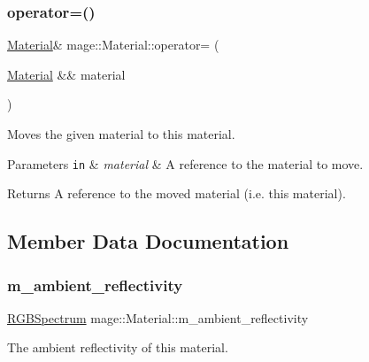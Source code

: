 \subsubsection{\texorpdfstring{operator=()}{operator=()}\hspace{0.1cm}{\footnotesize\ttfamily [2/2]}}
{\footnotesize\ttfamily \hyperlink{structmage_1_1_material}{Material}\& mage\+::\+Material\+::operator= (\begin{DoxyParamCaption}\item[{\hyperlink{structmage_1_1_material}{Material} \&\&}]{material }\end{DoxyParamCaption})\hspace{0.3cm}{\ttfamily [default]}}

Moves the given material to this material.


\begin{DoxyParams}[1]{Parameters}
\mbox{\tt in}  & {\em material} & A reference to the material to move. \\
\hline
\end{DoxyParams}
\begin{DoxyReturn}{Returns}
A reference to the moved material (i.\+e. this material). 
\end{DoxyReturn}


\subsection{Member Data Documentation}
\hypertarget{structmage_1_1_material_ad8fb842410fe751ad220185271a00448}{}\label{structmage_1_1_material_ad8fb842410fe751ad220185271a00448} 
\subsubsection{\texorpdfstring{m\+\_\+ambient\+\_\+reflectivity}{m\_ambient\_reflectivity}}
{\footnotesize\ttfamily \hyperlink{structmage_1_1_r_g_b_spectrum}{R\+G\+B\+Spectrum} mage\+::\+Material\+::m\+\_\+ambient\+\_\+reflectivity}

The ambient reflectivity of this material. \hypertarget{structmage_1_1_material_a72a90b9d339d705b5fd46098df5892e2}{}\label{structmage_1_1_material_a72a90b9d339d705b5fd46098df5892e2} 
